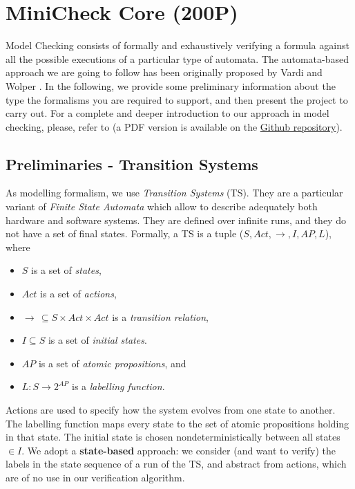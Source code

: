 \documentclass{article}
\begin{document}
\section{MiniCheck Core (200P)}

Model Checking consists of formally and exhaustively verifying a formula 
against all the possible executions of a particular type of automata. 
The automata-based approach we are going to follow has been originally proposed by 
Vardi and Wolper \cite{VarWol}.
In the following, we provide some preliminary information 
about the type the formalisms you are required to support, 
and then present the project to carry out. 
For a complete and deeper introduction to our approach in model checking, 
please, refer to \cite{BaKa} (a PDF version is available on the 
\href{https://github.com/francescopont/MiniCheck.git}{Github repository}).


\subsection{Preliminaries - Transition Systems}
\label{subsec-ts}
As modelling formalism, we use \emph{Transition Systems} (TS). They are a particular variant 
of \emph{Finite State Automata} which allow to describe adequately both hardware and software systems. 
They are defined over infinite runs, and they do not have a set of final states. 
Formally, a TS is a tuple ($S, Act, \rightarrow, I, AP, L$), where 
\begin{itemize}
    \item $S$ is a set of \emph{states},
    \item $Act$ is a set of \emph{actions},
    \item $\longrightarrow\,\subseteq S \times Act \times Act$ is a \emph{transition relation},
    \item $I \subseteq S$ is a set of \emph{initial states}.
    \item $AP$ is a set of \emph{atomic propositions}, and 
    \item $L : S \rightarrow 2^{AP}$ is a \emph{labelling function}.
\end{itemize}
Actions are used to specify how the system evolves from one state to another. The labelling function 
maps every state to the set of atomic propositions holding in that state. The initial state is chosen 
nondeterministically between all states $\in I$.
We adopt a \textbf{state-based} approach: we consider (and want to verify) the labels in the state sequence 
of a run of the TS, and abstract from actions, which are of no use in our verification algorithm. 
\end{document}
